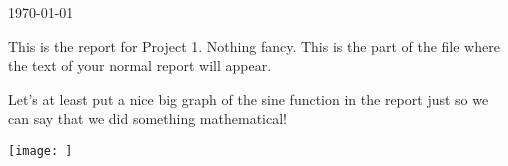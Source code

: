 \documentclass[11pt]{article}
\begin{document}
\today

\begin{report}
This is the report for Project 1. Nothing fancy. This is the part of the file where the text of your normal report will appear.

Let's at least put a nice big graph of the sine function in the report just so we can say that we did something mathematical!

\texttt{[image: ]}

\end{report}
\end{document}
